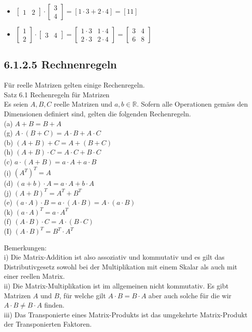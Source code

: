 \documentclass[10pt]{article}
\begin{document}
\begin{itemize}
  \item $\left[\begin{array}{ll}1 & 2\end{array}\right] \cdot\left[\begin{array}{l}3 \\ 4\end{array}\right]=[1 \cdot 3+2 \cdot 4]=[11]$
  \item $\left[\begin{array}{l}1 \\ 2\end{array}\right] \cdot\left[\begin{array}{ll}3 & 4\end{array}\right]=\left[\begin{array}{cc}1 \cdot 3 & 1 \cdot 4 \\ 2 \cdot 3 & 2 \cdot 4\end{array}\right]=\left[\begin{array}{ll}3 & 4 \\ 6 & 8\end{array}\right]$
\end{itemize}

\subsection*{6.1.2.5 Rechnenregeln}
Für reelle Matrizen gelten einige Rechenregeln.\\
Satz 6.1 Rechenregeln für Matrizen\\
Es seien $A, B, C$ reelle Matrizen und $a, b \in \mathbb{R}$. Sofern alle Operationen gemäss den Dimensionen definiert sind, gelten die folgenden Rechenregeln.\\
(a) $A+B=B+A$\\
(g) $A \cdot(B+C)=A \cdot B+A \cdot C$\\
(b) $(A+B)+C=A+(B+C)$\\
(h) $(A+B) \cdot C=A \cdot C+B \cdot C$\\
(c) $a \cdot(A+B)=a \cdot A+a \cdot B$\\
(i) $\left(A^{T}\right)^{T}=A$\\
(d) $(a+b) \cdot A=a \cdot A+b \cdot A$\\
(j) $(A+B)^{T}=A^{T}+B^{T}$\\
(e) $(a \cdot A) \cdot B=a \cdot(A \cdot B)=A \cdot(a \cdot B)$\\
(k) $(a \cdot A)^{T}=a \cdot A^{T}$\\
(f) $(A \cdot B) \cdot C=A \cdot(B \cdot C)$\\
(I) $(A \cdot B)^{T}=B^{T} \cdot A^{T}$

Bemerkungen:\\
i) Die Matrix-Addition ist also assoziativ und kommutativ und es gilt das Distributivgesetz sowohl bei der Multiplikation mit einem Skalar als auch mit einer reellen Matrix.\\
ii) Die Matrix-Multiplikation ist im allgemeinen nicht kommutativ. Es gibt Matrizen $A$ und $B$, für welche gilt $A \cdot B=B \cdot A$ aber auch solche für die wir $A \cdot B \neq B \cdot A$ finden.\\
iii) Das Transponierte eines Matrix-Produkts ist das umgekehrte Matrix-Produkt der Transponierten Faktoren.
\end{document}
